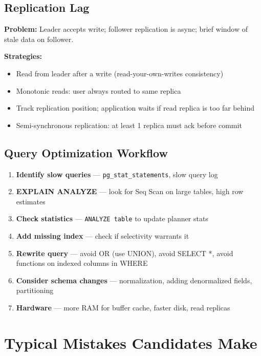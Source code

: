 \documentclass[11pt]{article}
\providecommand{\tightlist}{\setlength{\itemsep}{1pt}\setlength{\parskip}{0pt}}
\begin{document}
\subsection{Replication Lag}\label{replication-lag}

\textbf{Problem:} Leader accepts write; follower replication is async; brief window of stale data on follower.

\textbf{Strategies:}

\begin{itemize}
\tightlist
\item
  Read from leader after a write (read-your-own-writes consistency)
\item
  Monotonic reads: user always routed to same replica
\item
  Track replication position; application waits if read replica is too far behind
\item
  Semi-synchronous replication: at least 1 replica must ack before commit
\end{itemize}

\subsection{Query Optimization Workflow}\label{query-optimization-workflow}

\begin{enumerate}
\def\labelenumi{\arabic{enumi}.}
\tightlist
\item
  \textbf{Identify slow queries} --- \texttt{pg\_stat\_statements}, slow query log
\item
  \textbf{EXPLAIN ANALYZE} --- look for Seq Scan on large tables, high row estimates
\item
  \textbf{Check statistics} --- \texttt{ANALYZE\ table} to update planner stats
\item
  \textbf{Add missing index} --- check if selectivity warrants it
\item
  \textbf{Rewrite query} --- avoid OR (use UNION), avoid SELECT *, avoid functions on indexed columns in WHERE
\item
  \textbf{Consider schema changes} --- normalization, adding denormalized fields, partitioning
\item
  \textbf{Hardware} --- more RAM for buffer cache, faster disk, read replicas
\end{enumerate}

\section{Typical Mistakes Candidates Make}\label{typical-mistakes-candidates-make}
\end{document}
